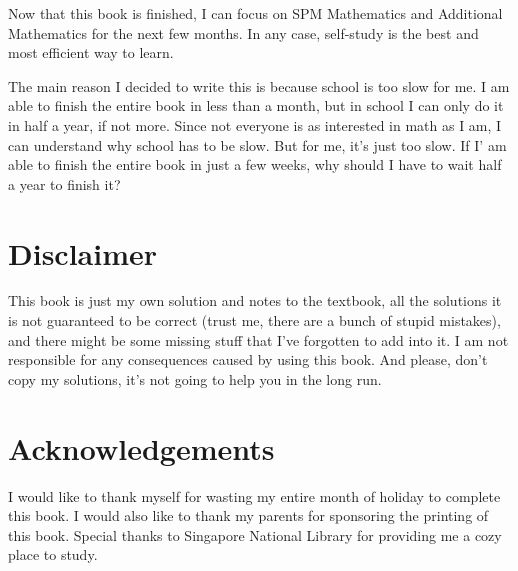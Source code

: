 \documentclass{report}
\begin{document}
Now that this book is finished, I can focus on SPM Mathematics and Additional
Mathematics for the next few months. In any case, self-study is the best and
most efficient way to learn.

The main reason I decided to write this is because school is too slow for me. I
am able to finish the entire book in less than a month, but in school I can
only do it in half a year, if not more. Since not everyone is as interested in
math as I am, I can understand why school has to be slow. But for me, it's just
too slow. If I' am able to finish the entire book in just a few weeks, why
should I have to wait half a year to finish it?

\section*{Disclaimer}

This book is just my own solution and notes to the textbook, all the solutions
it is not guaranteed to be correct (trust me, there are a bunch of stupid
mistakes), and there might be some missing stuff that I've forgotten to add
into it. I am not responsible for any consequences caused by using this book.
And please, don't copy my solutions, it's not going to help you in the long
run.

\section*{Acknowledgements}

I would like to thank myself for wasting my entire month of holiday to complete
this book. I would also like to thank my parents for sponsoring the printing of
this book. Special thanks to Singapore National Library for providing me a cozy
place to study.

\singlespacing{}

\doublespacing{}
\tableofcontents
\singlespacing{}
\newpage
\end{document}

